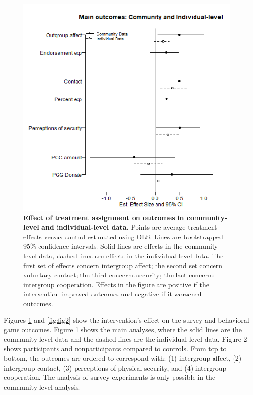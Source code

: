 \documentclass[11pt]{article}
\begin{document}
\begin{figure}[H]
\centering
\includegraphics[width=.7\textwidth]{../../../figs/ecpn_coefplots_SurveyOuts-cats.png}
\caption{\label{fig:fig1} \textbf{Effect of treatment assignment on outcomes in community-level and individual-level data.} Points are average treatment effects versus control estimated using OLS. Lines are bootstrapped 95\% confidence intervals.  Solid lines are effects in the community-level data, dashed lines are effects in the individual-level data.  The first set of effects concern intergroup affect; the second set concern voluntary contact; the third concerns security; the last concerns intergroup cooperation.  Effects in the figure are positive if the intervention improved outcomes and negative if it worsened outcomes.}
\end{figure}

Figures \ref{fig:fig1} and \ref{fig:fig2} show the intervention's effect
on the survey and behavioral game outcomes. Figure 1 shows the main
analyses, where the solid lines are the community-level data and the
dashed lines are the individual-level data. Figure 2 shows participants
and nonparticipants compared to controls. From top to bottom, the
outcomes are ordered to correspond with: (1) intergroup affect, (2)
intergroup contact, (3) perceptions of physical security, and (4)
intergroup cooperation. The analysis of survey experiments is only
possible in the community-level analysis.
\end{document}

